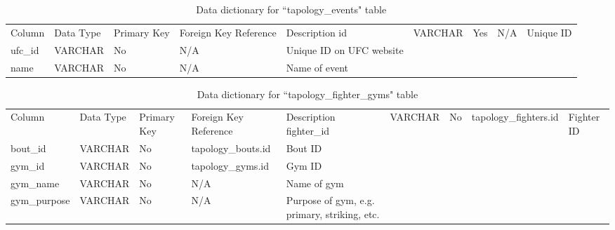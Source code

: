 \documentclass[12pt,twoside]{report}
\begin{document}
\tiny 
\begin{longtable}{lllll}
\caption{Data dictionary for ``tapology\_events" table}\\ 
\toprule
Column  & Data Type & Primary Key & Foreign Key Reference & Description               \endfirsthead 
\toprule
id      & VARCHAR   & Yes         & N/A                   & Unique ID                 \\
ufc\_id & VARCHAR   & No          & N/A                   & Unique ID on UFC website  \\
name    & VARCHAR   & No          & N/A                   & Name of event             \\
\bottomrule
\end{longtable}
\normalsize


\tiny 
\begin{longtable}{lllll}
\caption{Data dictionary for ``tapology\_fighter\_gyms" table}\\ 
\toprule
Column       & Data Type & Primary Key & Foreign Key Reference & Description                                   \endfirsthead 
\toprule
fighter\_id  & VARCHAR   & No          & tapology\_fighters.id & Fighter ID                                    \\
bout\_id     & VARCHAR   & No          & tapology\_bouts.id    & Bout ID                                       \\
gym\_id      & VARCHAR   & No          & tapology\_gyms.id     & Gym ID                                        \\
gym\_name    & VARCHAR   & No          & N/A                   & Name of gym                                   \\
gym\_purpose & VARCHAR   & No          & N/A                   & Purpose of gym, e.g. primary, striking, etc.  \\
\bottomrule
\end{longtable}
\normalsize
\end{document}
